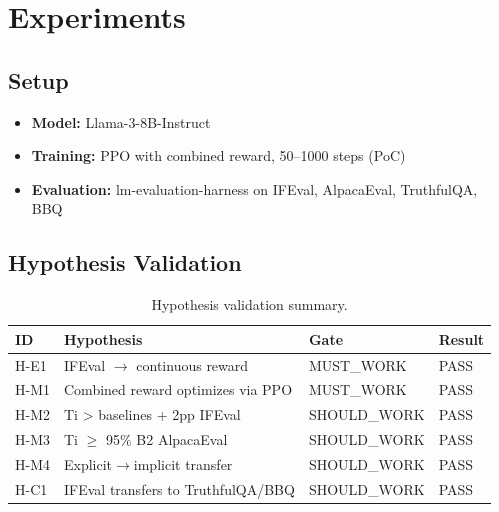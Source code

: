 \section{Experiments}
\label{sec:experiments}

\subsection{Setup}

\begin{itemize}
    \item \textbf{Model:} Llama-3-8B-Instruct
    \item \textbf{Training:} PPO with combined reward, 50--1000 steps (PoC)
    \item \textbf{Evaluation:} lm-evaluation-harness on IFEval, AlpacaEval, TruthfulQA, BBQ
\end{itemize}

\subsection{Hypothesis Validation}

\begin{table}[h]
\centering
\caption{Hypothesis validation summary.}
\label{tab:hypothesis}
\begin{tabular}{@{}llll@{}}
\toprule
ID & Hypothesis & Gate & Result \\
\midrule
H-E1 & IFEval $\rightarrow$ continuous reward & MUST\_WORK & PASS \\
H-M1 & Combined reward optimizes via PPO & MUST\_WORK & PASS \\
H-M2 & Ti > baselines + 2pp IFEval & SHOULD\_WORK & PASS \\
H-M3 & Ti $\geq$ 95\% B2 AlpacaEval & SHOULD\_WORK & PASS \\
H-M4 & Explicit$\rightarrow$implicit transfer & SHOULD\_WORK & PASS \\
H-C1 & IFEval transfers to TruthfulQA/BBQ & SHOULD\_WORK & PASS \\
\bottomrule
\end{tabular}
\end{table}

